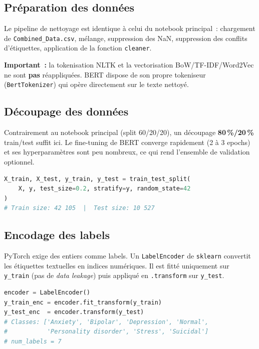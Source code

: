 \documentclass[12pt,a4paper]{article}
\begin{document}
\subsection{Préparation des données}

Le pipeline de nettoyage est identique à celui du notebook principal~: chargement de
\texttt{Combined\_Data.csv}, mélange, suppression des NaN, suppression des conflits
d'étiquettes, application de la fonction \texttt{cleaner}.

\textbf{Important~:} la tokenisation NLTK et la vectorisation BoW/TF-IDF/Word2Vec
ne sont \textbf{pas} réappliquées. BERT dispose de son propre tokeniseur
(\texttt{BertTokenizer}) qui opère directement sur le texte nettoyé.

\subsection{Découpage des données}

Contrairement au notebook principal (split 60/20/20), un découpage \textbf{80\,\%/20\,\%}
train/test suffit ici. Le fine-tuning de BERT converge rapidement (2 à 3 epochs) et ses
hyperparamètres sont peu nombreux, ce qui rend l'ensemble de validation optionnel.

\begin{lstlisting}[language=Python]
X_train, X_test, y_train, y_test = train_test_split(
    X, y, test_size=0.2, stratify=y, random_state=42
)
# Train size: 42 105  |  Test size: 10 527
\end{lstlisting}

\subsection{Encodage des labels}

PyTorch exige des entiers comme labels. Un \texttt{LabelEncoder} de \texttt{sklearn}
convertit les étiquettes textuelles en indices numériques. Il est fitté uniquement sur
\texttt{y\_train} (pas de \textit{data leakage}) puis appliqué en \texttt{.transform}
sur \texttt{y\_test}.

\begin{lstlisting}[language=Python]
encoder = LabelEncoder()
y_train_enc = encoder.fit_transform(y_train)
y_test_enc  = encoder.transform(y_test)
# Classes: ['Anxiety', 'Bipolar', 'Depression', 'Normal',
#           'Personality disorder', 'Stress', 'Suicidal']
# num_labels = 7
\end{lstlisting}
\end{document}
